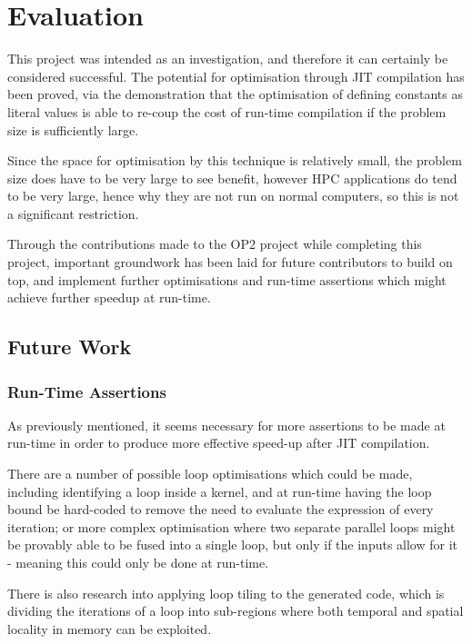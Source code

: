 
\section{Evaluation}
\label{s:eval}

This project was intended as an investigation, and therefore it can certainly be considered successful. The potential for optimisation through JIT compilation has been proved, via the demonstration that the optimisation of defining constants as literal values is able to re-coup the cost of run-time compilation if the problem size is sufficiently large.
\par
Since the space for optimisation by this technique is relatively small, the problem size does have to be very large to see benefit, however HPC applications do tend to be very large, hence why they are not run on normal computers, so this is not a significant restriction.
\par
Through the contributions made to the OP2 project while completing this project, important groundwork has been laid for future contributors to build on top, and implement further optimisations and run-time assertions which might achieve further speedup at run-time.

\subsection{Future Work}
\label{ss:fw}

\subsubsection{Run-Time Assertions}
As previously mentioned, it seems necessary for more assertions to be made at run-time in order to produce more effective speed-up after JIT compilation. \par
There are a number of possible loop optimisations which could be made, including identifying a loop inside a kernel, and at run-time having the loop bound be hard-coded to remove the need to evaluate the expression of every iteration; or more complex optimisation where two separate parallel loops might be provably able to be fused into a single loop, but only if the inputs allow for it - meaning this could only be done at run-time.

\noindent There is also research into applying loop tiling to the generated code, which is dividing the iterations of a loop into sub-regions where both temporal and spatial locality in memory can be exploited. \par

